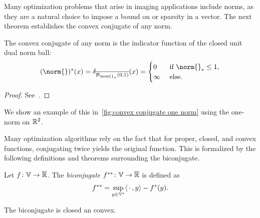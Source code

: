 Many optimization problems that arise in imaging applications include norms, as they are a natural choice to impose a bound on or sparsity in a vector.
The next theorem establishes the convex conjugate of any norm.
\begin{theorem}%
	\label{th:convex conjugate of any norm}
	The convex conjugate of any norm is the indicator function of the closed unit dual norm ball:
	\begin{equation}
		\ConvexConjugate{(\norm{})}(x) = \IndicatorFunction{\Closure{\Ball{\norm{}_{\ast}}{\num{0}}{\num{1}}}}(x) = \begin{cases}
			\num{0} &\ \text{if}\ \norm{}_{\ast} \leq \num{1}, \\
			\infty &\ \text{else}.
		\end{cases}
	\end{equation}
\end{theorem}
\begin{proof}
	See~\cite[section 4.4.12]{beck_firstorder_2017}.
\end{proof}
We show an example of this in~\cref{fig:convex conjugate one norm} using the one-norm on \( \mathbb{R}^{\num{2}} \).

Many optimization algorithms rely on the fact that for proper, closed, and convex functions, conjugating twice yields the original function.
This is formalized by the following definitions and theorems surrounding the biconjugate.
\begin{definition}[Biconjugate]%
	\label{def:biconjugate}
	Let \( f \colon \mathbb{V} \to \overline{\mathbb{R}} \).
	The \emph{biconjugate} \( f^{\ast\ast} \colon \mathbb{V} \to \overline{\mathbb{R}} \) is defined as
	\[
		f^{\ast\ast} = \sup_{y \in \mathbb{V}^{\ast}}\langle \,\cdot\,, y \rangle - f^{\ast}(y).
	\]
\end{definition}
The biconjugate is closed an convex.

